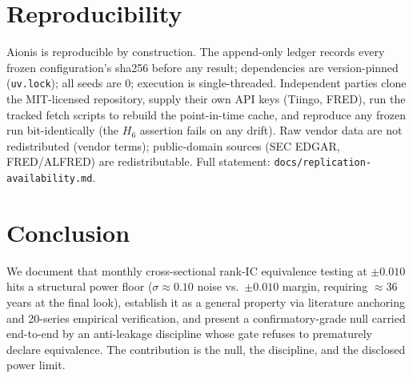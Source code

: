 \documentclass[11pt,a4paper]{article}
\begin{document}
\section{Reproducibility}\label{sec:replication}

Aionis is reproducible by construction. The append-only ledger records every frozen
configuration's sha256 before any result; dependencies are version-pinned
(\texttt{uv.lock}); all seeds are $0$; execution is single-threaded. Independent
parties clone the MIT-licensed repository, supply their own API keys (Tiingo, FRED),
run the tracked fetch scripts to rebuild the point-in-time cache, and reproduce any
frozen run bit-identically (the $H_6$ assertion fails on any drift). Raw vendor data
are not redistributed (vendor terms); public-domain sources (SEC EDGAR, FRED/ALFRED)
are redistributable. Full statement: \texttt{docs/replication-availability.md}.

\section{Conclusion}\label{sec:conclusion}

We document that monthly cross-sectional rank-IC equivalence testing at $\pm 0.010$
hits a structural power floor ($\sigma\!\approx\!0.10$ noise vs.\ $\pm 0.010$ margin,
requiring $\approx 36$ years at the final look), establish it as a general property
via literature anchoring and 20-series empirical verification, and present a
confirmatory-grade null carried end-to-end by an anti-leakage discipline whose gate
refuses to prematurely declare equivalence. The contribution is the null, the
discipline, and the disclosed power limit.



\end{document}
